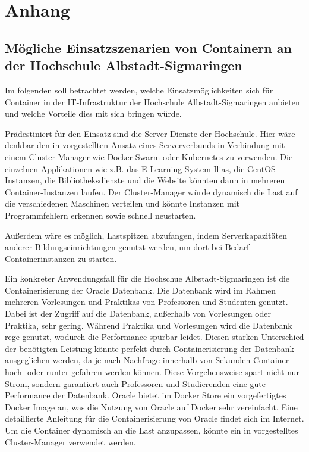 \section{Anhang}
\label{sec:anhang}

\subsection{Mögliche Einsatzszenarien von Containern an der Hochschule Albstadt-Sigmaringen}
\label{app:EinsatzHSAlbSig}

Im folgenden soll betrachtet werden, welche Einsatzmöglichkeiten sich für Container in der IT-Infrastruktur der Hochschule Albstadt-Sigmaringen anbieten und welche Vorteile dies mit sich bringen würde. 

Prädestiniert für den Einsatz sind die Server-Dienste der Hochschule.
Hier wäre denkbar den in  vorgestellten Ansatz eines Serververbunds in Verbindung mit einem Cluster Manager wie Docker Swarm oder Kubernetes zu verwenden.
Die einzelnen Applikationen wie z.B. das E-Learning System Ilias, die CentOS Instanzen, die Bibliotheksdienste und die Website könnten dann in mehreren Container-Instanzen laufen.
Der Cluster-Manager würde dynamisch die Last auf die verschiedenen Maschinen verteilen und könnte Instanzen mit Programmfehlern erkennen sowie schnell neustarten.

Außerdem wäre es möglich, Lastspitzen abzufangen, indem Serverkapazitäten anderer Bildungseinrichtungen genutzt werden, um dort bei Bedarf Containerinstanzen zu starten.

Ein konkreter Anwendungsfall für die Hochschue Albstadt-Sigmaringen ist die Containerisierung der Oracle Datenbank. Die Datenbank wird im Rahmen mehreren Vorlesungen und Praktikas von Professoren und Studenten genutzt. Dabei ist der Zugriff auf die Datenbank, außerhalb von Vorlesungen oder Praktika, sehr gering. Während Praktika und Vorlesungen wird die Datenbank rege genutzt, wodurch die Performance spürbar leidet. Diesen starken Unterschied der benötigten Leistung könnte perfekt durch Containerisierung der Datenbank ausgeglichen werden, da je nach Nachfrage innerhalb von Sekunden Container hoch- oder runter-gefahren werden können. Diese Vorgehensweise spart nicht nur Strom, sondern garantiert auch Professoren und Studierenden eine gute Performance der Datenbank. Oracle bietet im Docker Store ein vorgefertigtes Docker Image an, was die Nutzung von Oracle auf Docker sehr vereinfacht. Eine detaillierte Anleitung für die Containerisierung von Oracle findet sich im Internet. Um die Container dynamisch an die Last anzupassen, könnte ein in  vorgestelltes Cluster-Manager verwendet werden.

